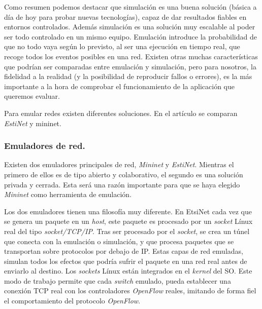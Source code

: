\documentclass[a4paper,11pt]{book}
\begin{document}
Como resumen podemos destacar que simulación es una buena solución (básica a día de hoy para probar nuevas tecnologías), capaz de dar resultados fiables en entornos controlados. Además simulación es una solución muy escalable al poder ser todo controlado en un mismo equipo. Emulación introduce la probabilidad de que no todo vaya según lo previsto, al ser una ejecución en tiempo real, que recoge todos los eventos posibles en una red. Existen otras muchas características que podrían ser comparadas entre emulación y simulación, pero para nosotros, la fidelidad a la realidad (y la posibilidad de reproducir fallos o errores), es la más importante a la hora de comprobar el funcionamiento de la aplicación que queremos evaluar.

Para emular redes existen diferentes soluciones. En el artículo \cite{wang2014comparison} se comparan \textit{EstiNet} y mininet.

\subsubsection{Emuladores de red.} Existen dos emuladores principales de red, \emph{Mininet} y \textit{EstiNet}. Mientras el primero de ellos es de tipo abierto y colaborativo, el segundo es una solución privada y cerrada. Esta será una razón importante para que se haya elegido \emph{Mininet} como herramienta de emulación. 

Los dos emuladores tienen una filosofía muy diferente. En EtsiNet cada vez que se genera un paquete en un \textit{host}, este paquete es procesado por un \textit{socket} Línux real del tipo \textit{socket/TCP/IP}. Tras ser procesado por el \textit{socket}, se crea un túnel que conecta con la emulación o simulación, y que procesa paquetes que se transportan sobre protocolos por debajo de \ac{IP}. Estas capas de red emuladas, simulan todos los efectos que podría sufrir el paquete en una red real antes de enviarlo al destino. Los \textit{sockets} Línux están integrados en el \textit{kernel} del \ac{SO}. Este modo de trabajo permite que cada \textit{switch} emulado, pueda establecer una conexión \ac{TCP} real con los controladores \emph{OpenFlow} reales, imitando de forma fiel el comportamiento del protocolo \emph{OpenFlow}.
\end{document}
